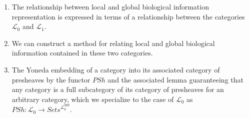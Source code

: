 \begin{frame}
\begin{enumerate}
\item The relationship between local and global biological information representation is expressed in terms of a relationship between the categories $\mathcal{L}_0$ and $\mathcal{L}_1$. 

\item We can construct a method for relating local and global biological information contained in these two categories.

\item The Yoneda embedding of a category into its associated category of presheaves by the functor $PSh$ and the associated lemma guaranteeing that any category is a full subcategory of its category of presheaves for an arbitrary category, which we specialize to the case of $\mathcal{L}_0$ as $PSh: \mathcal{L}_0 \rightarrow \textit{Sets}^{\mathcal{L}_0^{opp}}$.
\end{enumerate}
\end{frame}